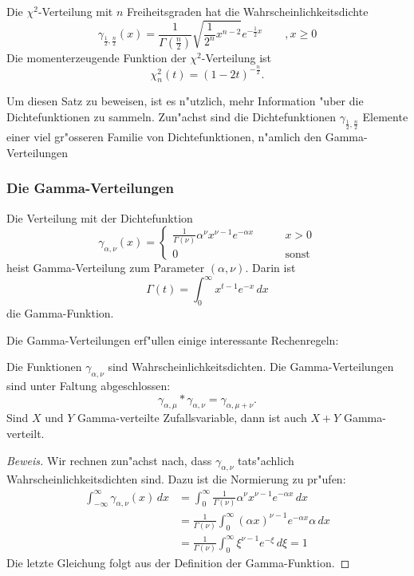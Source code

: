 {\small

\begin{satz}\label{chi2}
Die $\chi^2$-Verteilung mit $n$ Freiheitsgraden hat
die Wahrscheinlichkeitsdichte
\[
\gamma_{\frac12,\frac{n}2}(x)=\frac1{\Gamma(\frac{n}2)}\sqrt{\frac1{2^n}x^{n-2}}e^{-\frac12x}\qquad,x\ge 0
\]
Die momenterzeugende Funktion der $\chi^2$-Verteilung ist
\[
\chi_n^2(t)=(1-2t)^{-\frac{n}2}.
\]
\end{satz}

Um diesen Satz zu beweisen, ist es n"utzlich, mehr Information "uber die
Dichtefunktionen zu sammeln. Zun"achst sind die Dichtefunktionen
$\gamma_{\frac12,\frac{n}2}$ Elemente einer viel gr"osseren Familie von
Dichtefunktionen, n"amlich den Gamma-Verteilungen

\subsubsection{Die Gamma-Verteilungen}
\begin{definition}
Die Verteilung mit der Dichtefunktion
\[
\gamma_{\alpha,\nu}(x)=\begin{cases}
\displaystyle \frac1{\Gamma(\nu)}\alpha^\nu x^{\nu-1}e^{-\alpha x}&\qquad x>0\\
0&\qquad\text{sonst}
\end{cases}
\]
heist Gamma-Verteilung zum Parameter $(\alpha,\nu)$. Darin ist
\[
\Gamma(t)=\int_0^\infty x^{t-1}e^{-x}\,dx
\]
die Gamma-Funktion.
\end{definition}

Die Gamma-Verteilungen erf"ullen einige interessante Rechenregeln:
\begin{satz} Die Funktionen $\gamma_{\alpha,\nu}$ sind Wahrscheinlichkeitsdichten.
Die Gamma-Verteilungen sind unter Faltung abgeschlossen:
\[
\gamma_{\alpha,\mu}*\gamma_{\alpha,\nu}=\gamma_{\alpha,\mu+\nu}.
\]
Sind $X$ und $Y$ Gamma-verteilte Zufallsvariable, dann ist auch $X+Y$
Gamma-verteilt.
\end{satz}
\begin{proof}[Beweis]
Wir rechnen zun"achst nach, dass $\gamma_{\alpha,\nu}$ tats"achlich
Wahrscheinlichkeitsdichten sind. Dazu ist die Normierung zu pr"ufen:
\begin{align*}
\int_{-\infty}^\infty \gamma_{\alpha,\nu}(x)\,dx
&=\int_0^\infty\frac1{\Gamma(\nu)}\alpha^\nu x^{\nu-1}e^{-\alpha x}\,dx\\
&=\frac{1}{\Gamma(\nu)}\int_0^\infty (\alpha x)^{\nu-1}e^{-\alpha x}
\alpha\,dx\\
&=\frac1{\Gamma(\nu)}\int_0^\infty \xi^{\nu-1}e^{-\xi}\,d\xi=1
\end{align*}
Die letzte Gleichung folgt aus der Definition der Gamma-Funktion.


\end{proof}}
